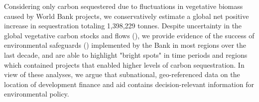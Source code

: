 \documentclass{article}\usepackage[]{graphicx}\usepackage[]{color}
\newenvironment{knitrout}{}{}  %
\begin{document}
\begin{knitrout}
Considering only carbon sequestered due to fluctuations in vegetative biomass caused by World Bank projects, we conservatively estimate a global net positive increase in sequestration totaling 1,398,229 tonnes. 
Despite uncertainty in the global vegetative carbon stocks and flows (\cite{coulston_complex_2015}), we provide evidence of the success of environmental safeguards (\cite{laurance_reducing_2015}) implemented by the Bank in most regions over the last decade, and are able to highlight "bright spots" in time periods and regions which contained projects that enabled higher levels of carbon sequestration. 
In view of these analyses, we argue that subnational, geo-referenced data on the location of development finance and aid contains decision-relevant information for environmental policy.




\newpage
\printbibliography


\end{knitrout}
\end{document}
